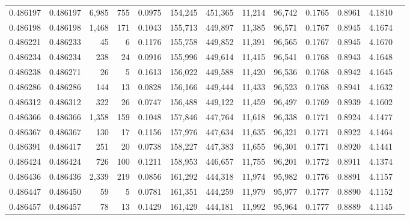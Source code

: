 \begin{tabular}{rrrrrrrrrrrrr}
0.486197 & 0.486197 & 6,985 &   755 &                                     0.0975 & 154,245 & 451,365 &  11,214 &  96,742 & 0.1765 & 0.8961 & 4.1810 \\
0.486198 & 0.486198 & 1,468 &   171 &                                     0.1043 & 155,713 & 449,897 &  11,385 &  96,571 & 0.1767 & 0.8945 & 4.1674 \\
0.486221 & 0.486233 &    45 &     6 &                                     0.1176 & 155,758 & 449,852 &  11,391 &  96,565 & 0.1767 & 0.8945 & 4.1670 \\
0.486234 & 0.486234 &   238 &    24 &                                     0.0916 & 155,996 & 449,614 &  11,415 &  96,541 & 0.1768 & 0.8943 & 4.1648 \\
0.486238 & 0.486271 &    26 &     5 &                                     0.1613 & 156,022 & 449,588 &  11,420 &  96,536 & 0.1768 & 0.8942 & 4.1645 \\
0.486286 & 0.486286 &   144 &    13 &                                     0.0828 & 156,166 & 449,444 &  11,433 &  96,523 & 0.1768 & 0.8941 & 4.1632 \\
0.486312 & 0.486312 &   322 &    26 &                                     0.0747 & 156,488 & 449,122 &  11,459 &  96,497 & 0.1769 & 0.8939 & 4.1602 \\
0.486366 & 0.486366 & 1,358 &   159 &                                     0.1048 & 157,846 & 447,764 &  11,618 &  96,338 & 0.1771 & 0.8924 & 4.1477 \\
0.486367 & 0.486367 &   130 &    17 &                                     0.1156 & 157,976 & 447,634 &  11,635 &  96,321 & 0.1771 & 0.8922 & 4.1464 \\
0.486391 & 0.486417 &   251 &    20 &                                     0.0738 & 158,227 & 447,383 &  11,655 &  96,301 & 0.1771 & 0.8920 & 4.1441 \\
0.486424 & 0.486424 &   726 &   100 &                                     0.1211 & 158,953 & 446,657 &  11,755 &  96,201 & 0.1772 & 0.8911 & 4.1374 \\
0.486436 & 0.486436 & 2,339 &   219 &                                     0.0856 & 161,292 & 444,318 &  11,974 &  95,982 & 0.1776 & 0.8891 & 4.1157 \\
0.486447 & 0.486450 &    59 &     5 &                                     0.0781 & 161,351 & 444,259 &  11,979 &  95,977 & 0.1777 & 0.8890 & 4.1152 \\
0.486457 & 0.486457 &    78 &    13 &                                     0.1429 & 161,429 & 444,181 &  11,992 &  95,964 & 0.1777 & 0.8889 & 4.1145 \\

\end{tabular}
